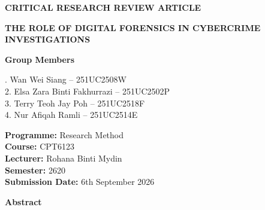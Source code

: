 \documentclass[12pt,a4paper]{article}
\begin{document}
\begin{center}
{\fontsize{18}{22}\selectfont\textbf{CRITICAL RESEARCH REVIEW ARTICLE}}

\vspace{0.5cm}

{\fontsize{18}{22}\selectfont\textbf{THE ROLE OF DIGITAL FORENSICS IN CYBERCRIME INVESTIGATIONS}}

\vspace{1cm}

{\fontsize{12}{14}\selectfont\textbf{Group Members}}

\vspace{0.3cm}

{\fontsize{12}{14}. Wan Wei Siang -- 251UC2508W\\
2. Elsa Zara Binti Fakhurrazi -- 251UC2502P\\
3. Terry Teoh Jay Poh -- 251UC2518F\\
4. Nur Afiqah Ramli -- 251UC2514E
}

\vspace{0.8cm}

{\fontsize{12}{14}\selectfont
\textbf{Programme:} Research Method\\
\textbf{Course:} CPT6123\\
\textbf{Lecturer:} Rohana Binti Mydin\\
\textbf{Semester:} 2620\\
\textbf{Submission Date:} 6th September 2026
}

\end{center}



\vspace{0.5cm}

\noindent
\textbf{Abstract}

\vspace{0.2cm}
\end{document}
